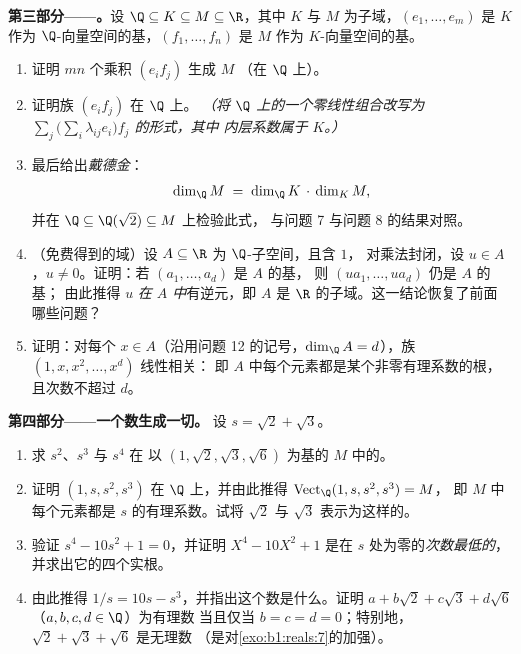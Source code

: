 \begin{problem}
\medskip
\noindent\textbf{第三部分——。}设 $\Q \subseteq K
\subseteq M \subseteq \R$，其中 $K$ 与 $M$ 为子域，$(e_1,
\dots, e_m)$ 是 $K$ 作为 $\Q$-向量空间的基，$(f_1,
\dots, f_n)$ 是 $M$ 作为 $K$-向量空间的基。
\begin{enumerate}[resume]
  \item 证明 $mn$ 个乘积 $(e_i f_j)$ 生成 $M$
        （在 $\Q$ 上）。
  \item 证明族 $(e_i f_j)$ 在 $\Q$ 上。
        \emph{（将 $\Q$ 上的一个零线性组合改写为 $\sum_j
        \bigl(\sum_i \lambda_{ij} e_i\bigr) f_j$ 的形式，其中
        内层系数属于 $K$。）}
  \item 最后给出\emph{戴德金}：
        \[
        \dim_\Q M \;=\; \dim_\Q K \,\cdot\, \dim_K M ,
        \]
        并在 $\Q \subseteq \Q(\sqrt2) \subseteq M$ 上检验此式，
        与问题 7 与问题 8 的结果对照。
  \item （免费得到的域）设 $A \subseteq \R$ 为
         $\Q$-子空间，且含 $1$，
        对乘法封闭，设 $u \in A$，$u \neq
        0$。证明：若 $(a_1, \dots, a_d)$ 是 $A$ 的基，
        则 $(u a_1, \dots, u a_d)$ 仍是 $A$ 的基；
        由此推得 $u$ \emph{在 $A$ 中}有逆元，即 $A$ 是
        $\R$ 的子域。这一结论恢复了前面
        哪些问题？
  \item 证明：对每个 $x \in A$（沿用问题 12 的记号，$\dim_\Q
        A = d$），族 $(1, x, x^2, \dots, x^{d})$ 线性相关：
        即 $A$ 中每个元素都是某个非零有理系数的根，
        且次数不超过 $d$。
\end{enumerate}

\medskip
\noindent\textbf{第四部分——一个数生成一切。}
设 $s = \sqrt2 + \sqrt3$。
\begin{enumerate}[resume]
  \item 求 $s^2$、$s^3$ 与 $s^4$ 在
        以 $(1, \sqrt2, \sqrt3, \sqrt6)$ 为基的 $M$ 中的。
  \item 证明 $(1, s, s^2, s^3)$ 在 $\Q$ 上，并由此推得
        $\operatorname{Vect}_\Q(1, s, s^2, s^3) = M$，
        即 $M$ 中每个元素都是 $s$ 的有理系数。试将
        $\sqrt2$ 与 $\sqrt3$ 表示为这样的。
  \item 验证 $s^4 - 10s^2 + 1 = 0$，并证明 $X^4 - 10X^2
        + 1$ 是在 $s$ 处为零的\emph{次数最低的}，
        并求出它的四个实根。
  \item 由此推得 $1/s = 10s - s^3$，并指出这个数是什么。证明
        $a + b\sqrt2 + c\sqrt3 + d\sqrt6$（$a,b,c,d \in \Q$）为有理数
        当且仅当 $b = c = d = 0$；特别地，
        $\sqrt2 + \sqrt3 + \sqrt6$ 是无理数
        （是对\cref{exo:b1:reals:7}的加强）。
\end{enumerate}


\end{problem}
